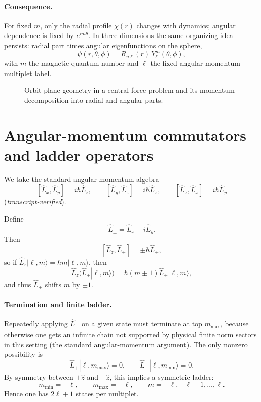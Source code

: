 \paragraph{Consequence.}
For fixed \(m\), only the radial profile \(\chi(r)\) changes with dynamics; angular dependence is fixed by \(e^{im\theta}\). In three dimensions the same organizing idea persists: radial part times angular eigenfunctions on the sphere,
\[
\psi(r,\theta,\phi)=R_{n\ell}(r)\,Y_\ell^m(\theta,\phi),
\]
with \(m\) the magnetic quantum number and \(\ell\) the fixed angular-momentum multiplet label.

\begin{figure}
\centering
{}
\caption{Orbit-plane geometry in a central-force problem and its momentum decomposition into radial and angular parts.}
\end{figure}

\section{Angular-momentum commutators and ladder operators}
We take the standard angular momentum algebra
\[
[\hat L_x,\hat L_y]=i\hbar \hat L_z,\qquad
[\hat L_y,\hat L_z]=i\hbar \hat L_x,\qquad
[\hat L_z,\hat L_x]=i\hbar \hat L_y
\]
(\textit{transcript-verified}).

Define
\[
\hat L_\pm=\hat L_x\pm i\hat L_y.
\]
Then
\[
[\hat L_z,\hat L_\pm]=\pm\hbar \hat L_\pm,
\]
so if \(\hat L_z|\ell,m\rangle=\hbar m|\ell,m\rangle\), then
\[
\hat L_z(\hat L_\pm|\ell,m\rangle)=\hbar(m\pm1)\hat L_\pm|\ell,m\rangle,
\]
and thus \(\hat L_\pm\) shifts \(m\) by \(\pm1\).

\paragraph{Termination and finite ladder.}
Repeatedly applying \(\hat L_+\) on a given state must terminate at top \(m_{\max}\), because otherwise one gets an infinite chain not supported by physical finite norm sectors in this setting (the standard angular-momentum argument). The only nonzero possibility is
\[
\hat L_+|\ell,m_{\max}\rangle=0,\qquad
\hat L_-|\ell,m_{\min}\rangle=0.
\]
By symmetry between \(+\hat z\) and \(-\hat z\), this implies a symmetric ladder:
\[
m_{\min}=-\ell,\qquad m_{\max}=+\ell,\qquad m=-\ell,-\ell+1,\ldots,\ell.
\]
Hence one has \(2\ell+1\) states per multiplet.


